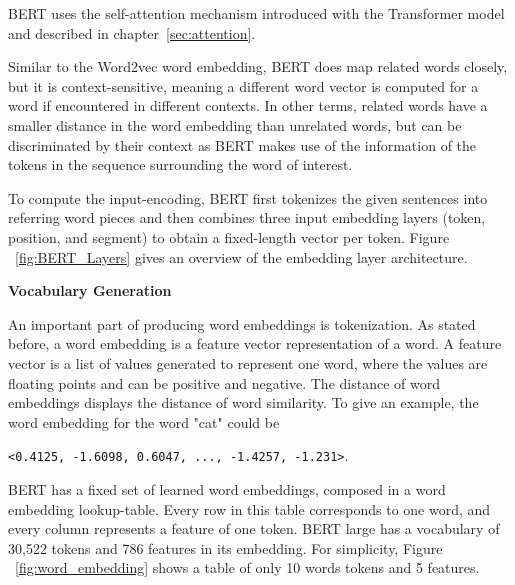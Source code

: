BERT uses the self-attention mechanism introduced with the Transformer model \cite{vaswani2017attention} and described in chapter~\ref{sec:attention}. 


Similar to the Word2vec word embedding, BERT does map related words closely, but it is context-sensitive, meaning a different word vector is computed for a word if encountered in different contexts. In other terms, related words have a smaller distance in the word embedding than unrelated words, but can be discriminated by their context as BERT makes use of the information of the tokens in the sequence surrounding the word of interest.

To compute the input-encoding, BERT first tokenizes the given sentences into referring word pieces and then combines three input embedding layers (token, position, and segment) to obtain a fixed-length vector per token. Figure ~\ref{fig:BERT_Layers} gives an overview of the embedding layer architecture.

\textbf{Vocabulary Generation}

An important part of producing word embeddings is tokenization. As stated before, a word embedding is a feature vector representation of a word. A feature vector is a list of values generated to represent one word, where the values are floating points and can be positive and negative. The distance of word embeddings displays the distance of word similarity. To give an example, the word embedding for the word "cat" could be

\texttt{<0.4125, -1.6098, 0.6047, ..., -1.4257, -1.231>}.


BERT has a fixed set of learned word embeddings, composed in a word embedding lookup-table. Every row in this table corresponds to one word, and every column represents a feature of one token.
BERT large has a vocabulary of 30,522 tokens and 786 features in its embedding. For simplicity, Figure ~\ref{fig:word_embedding} shows a table of only 10 words tokens and 5 features.

